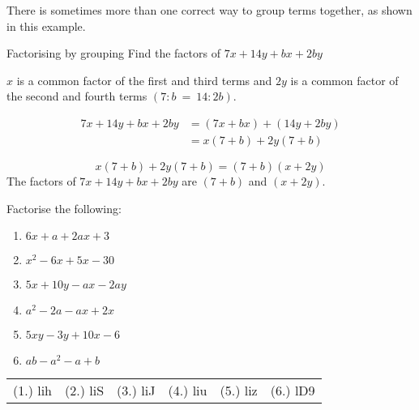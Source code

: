 There is sometimes more than one correct way to group terms together, as shown in this example.

\begin{wex}{Factorising by grouping }{Find the factors of $7x+14y+bx+2by$}
{


$x$ is a common factor of the first and third terms and $2y$ is a common factor of the second and fourth terms $(7:b~=~14:2b)$.\par 
{}

\begin{align*}
  7x+14y+bx+2by &= (7x+bx)+(14y+2by) \\
  &= x(7+b)+2y(7+b)
\end{align*}


\begin{equation*}
x(7+b)+2y(7+b) = (7+b)(x+2y)
\end{equation*}
The factors of $7x+14y+bx+2by$ are $(7+b)$ and $(x+2y)$.
}
\end{wex}




\begin{exercises}{}{
\nopagebreak
Factorise the following:
\begin{multicols}{2}
\begin{enumerate}[itemsep=5pt, label=\textbf{\arabic*}. ] 
\item $6x+a+2ax+3$
\item ${x}^{2}-6x+5x-30$
\item $5x+10y-ax-2ay$
\item ${a}^{2}-2a-ax+2x$
\item $5xy-3y+10x-6$
\item $ab - a^{2} - a + b$
\end{enumerate}
\end{multicols}
\practiceinfo 
\par 
\par \begin{tabular}[h]{cccccc}
(1.) lih  &  (2.) liS  &  (3.) liJ  &  (4.) liu  &  (5.) liz  & (6.) lD9 \end{tabular}
}
\end{exercises}


